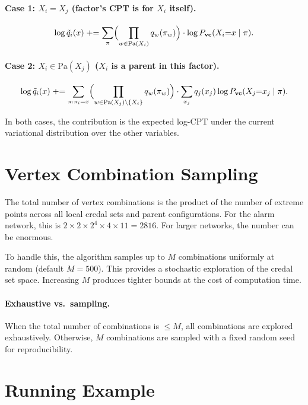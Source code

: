 \documentclass[11pt]{article}
\begin{document}
\paragraph{Case 1: $X_i = X_j$ (factor's CPT is for $X_i$ itself).}
\begin{equation}\label{eq:case1}
  \log \tilde{q}_i(x) \mathrel{+}= \sum_{\pi}
  \Bigl(\prod_{w \in \mathrm{Pa}(X_i)} q_w(\pi_w)\Bigr)
  \cdot \log P_{\mathbf{vc}}(X_i{=}x \mid \pi).
\end{equation}

\paragraph{Case 2: $X_i \in \mathrm{Pa}(X_j)$ ($X_i$ is a parent in this factor).}
\begin{equation}\label{eq:case2}
  \log \tilde{q}_i(x) \mathrel{+}= \sum_{\pi : \pi_i = x}
  \Bigl(\prod_{w \in \mathrm{Pa}(X_j) \setminus \{X_i\}} q_w(\pi_w)\Bigr)
  \cdot \sum_{x_j} q_j(x_j) \log P_{\mathbf{vc}}(X_j{=}x_j \mid \pi).
\end{equation}

In both cases, the contribution is the expected log-CPT under the current
variational distribution over the other variables.

\section{Vertex Combination Sampling}

The total number of vertex combinations is the product of the number of
extreme points across all local credal sets and parent configurations. For
the alarm network, this is $2 \times 2 \times 2^4 \times 4 \times 11 = 2816$.
For larger networks, the number can be enormous.

To handle this, the algorithm samples up to $M$ combinations uniformly at
random (default $M = 500$). This provides a stochastic exploration of the
credal set space. Increasing $M$ produces tighter bounds at the cost of
computation time.

\paragraph{Exhaustive vs.\ sampling.}
When the total number of combinations is $\leq M$, all combinations are
explored exhaustively. Otherwise, $M$ combinations are sampled with a
fixed random seed for reproducibility.

\section{Running Example}
\end{document}
